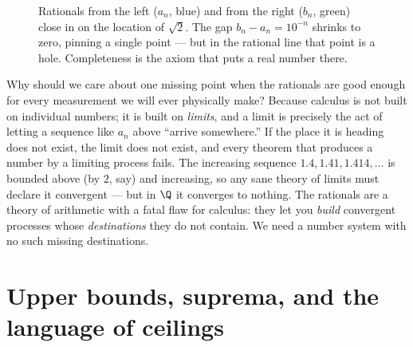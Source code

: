 \begin{figure}[H]
\centering
{}
\caption{Rationals from the left ($a_n$, blue) and from the right ($b_n$, green) close in
on the location of $\sqrt 2$. The gap $b_n-a_n=10^{-n}$ shrinks to zero, pinning a single
point --- but in the rational line that point is a hole. Completeness is the axiom that
puts a real number there.}
\label{ch41:fig-squeeze}
\end{figure}

\begin{whybox}
Why should we care about one missing point when the rationals are good enough for every
measurement we will ever physically make? Because calculus is not built on individual
numbers; it is built on \emph{limits}, and a limit is precisely the act of letting a
sequence like $a_n$ above ``arrive somewhere.'' If the place it is heading does not exist,
the limit does not exist, and every theorem that produces a number by a limiting process
fails. The increasing sequence $1.4, 1.41, 1.414,\ldots$ is bounded above (by $2$, say)
and increasing, so any sane theory of limits must declare it convergent --- but in $\Q$ it
converges to nothing. The rationals are a theory of arithmetic with a fatal flaw for
calculus: they let you \emph{build} convergent processes whose \emph{destinations} they do
not contain. We need a number system with no such missing destinations.
\end{whybox}

\section{Upper bounds, suprema, and the language of ceilings}
\label{ch41:sup}


